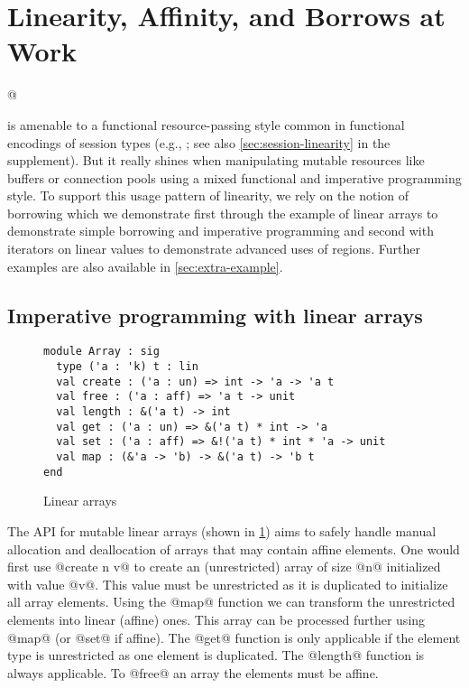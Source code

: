 \section{Linearity, Affinity, and Borrows at Work}
\label{motivation}

\lstMakeShortInline[keepspaces,basicstyle=\small\ttfamily]@

\lang{} is amenable to a functional resource-passing style
common in functional encodings of session types (e.g.,
\cite{DBLP:journals/jfp/Padovani17}; see also
\cref{sec:session-linearity} in the supplement). But it really shines
when manipulating mutable resources like buffers or connection pools
using a mixed functional and imperative programming style.
%
To support this usage pattern of linearity, we rely on
the notion of borrowing \cite{DBLP:conf/popl/BoylandR05} which
we demonstrate first through the example of linear arrays to demonstrate
simple borrowing and imperative programming and second with iterators
on linear values to demonstrate advanced uses of regions.
Further examples are also available in \cref{sec:extra-example}.

\subsection{Imperative programming with linear arrays}
\label{sec:imper-progr}

\begin{figure}[tp]
  \centering
\begin{lstlisting}
module Array : sig
  type ('a : 'k) t : lin
  val create : ('a : un) => int -> 'a -> 'a t
  val free : ('a : aff) => 'a t -> unit
  val length : &('a t) -> int
  val get : ('a : un) => &('a t) * int -> 'a
  val set : ('a : aff) => &!('a t) * int * 'a -> unit
  val map : (&'a -> 'b) -> &('a t) -> 'b t
end
\end{lstlisting}
  \vspace{-15pt}
  \caption{Linear arrays}
  \label{ex:array}
  \label{sig:array}
  \vspace{-10pt}
\end{figure}

The API for mutable linear arrays (shown in \cref{sig:array})
aims to safely handle manual allocation and
deallocation of arrays that may contain affine elements.
One would first use @create n v@ to create
an (unrestricted) array of size @n@ initialized with value
@v@. This value must be unrestricted as it is duplicated to
initialize all array elements. Using the @map@ function we
can transform the unrestricted elements into linear (affine)
ones. This array can be processed further using @map@ (or @set@ if
affine). The @get@ function is only applicable if the element type
is unrestricted as one element is duplicated. The @length@
function is always applicable. To @free@ an array the elements must be
affine.

